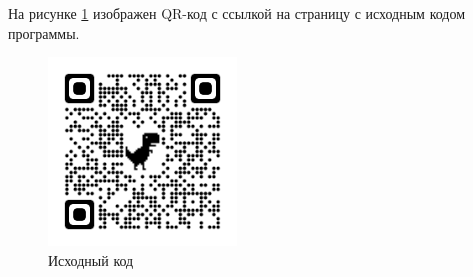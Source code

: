 
На рисунке \ref{fig:qrcode} изображен QR-код с ссылкой на страницу с исходным кодом программы.

\begin{figure}
    \includegraphics[width=5cm]{inc/qrcode_github.com.png}
    \caption{Исходный код}
    \label{fig:qrcode}
\end{figure}

